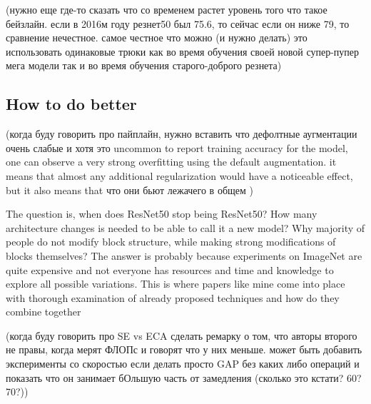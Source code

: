 






(нужно еще где-то сказать что со временем растет уровень того что такое бейзлайн. если в 2016м году резнет50 был 75.6, то сейчас если он ниже 79, то сравнение нечестное. самое честное что можно (и нужно делать) это использовать одинаковые трюки как во время обучения своей новой супер-пупер мега модели так и во время обучения старого-доброго резнета)



\subsection{How to do better}



(когда буду говорить про пайплайн, нужно вставить что дефолтные аугментации очень слабые и хотя это uncommon to report training accuracy for the model, one can observe a very strong overfitting using the default augmentation. it means that almost any additional regularization would have a noticeable effect, but it also means that что они бьют лежачего в общем    )


The question is, when does ResNet50 stop being ResNet50? How many architecture changes is needed to be able to call it a new model? Why majority of people do not modify block structure, while making strong modifications of blocks themselves? The answer is probably because experiments on ImageNet are quite expensive and not everyone has resources and time and knowledge to explore all possible variations. This is where papers like mine come into place with thorough examination of already proposed techniques and how do they combine together



(когда буду говорить про SE vs ECA сделать ремарку о том, что авторы второго не правы, когда мерят ФЛОПс и говорят что у них меньше. может быть добавить эксперименты со скоростью если делать просто GAP без каких либо операций и показать что он занимает бОльшую часть от замедления (сколько это кстати? 60? 70?))



